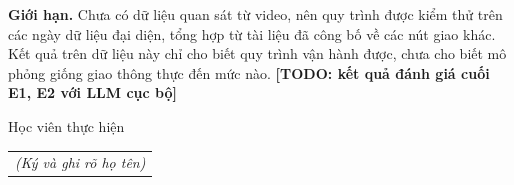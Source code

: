 \documentclass[../DoAn.tex]{subfiles}
\begin{document}
\textbf{Giới hạn.} Chưa có dữ liệu quan sát từ video, nên quy trình được kiểm thử trên các ngày dữ liệu đại diện, tổng hợp từ tài liệu đã công bố về các nút giao khác. Kết quả trên dữ liệu này chỉ cho biết quy trình vận hành được, chưa cho biết mô phỏng giống giao thông thực đến mức nào. \textbf{[TODO: kết quả đánh giá cuối E1, E2 với LLM cục bộ]}

\begin{flushright}
Học viên thực hiện\\
\begin{tabular}{@{}c@{}}
\textit{(Ký và ghi rõ họ tên)}
\end{tabular}
\end{flushright}
\end{document}
